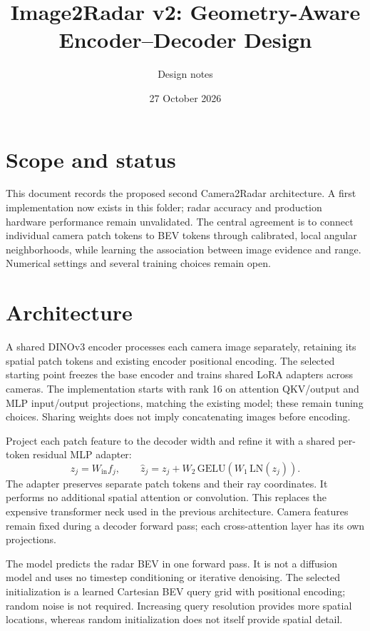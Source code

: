 \documentclass[11pt,a4paper]{article}
\title{Image2Radar v2: Geometry-Aware Encoder--Decoder Design}
\author{Design notes}
\date{27 October 2026}
\begin{document}
\maketitle

\section{Scope and status}
This document records the proposed second Camera2Radar architecture. A first implementation now exists in this folder; radar accuracy and production hardware performance remain unvalidated. The central agreement is to connect individual camera patch tokens to BEV tokens through calibrated, local angular neighborhoods, while learning the association between image evidence and range. Numerical settings and several training choices remain open.

\section{Architecture}
A shared DINOv3 encoder processes each camera image separately, retaining its spatial patch tokens and existing encoder positional encoding. The selected starting point freezes the base encoder and trains shared LoRA adapters across cameras. The implementation starts with rank 16 on attention QKV/output and MLP input/output projections, matching the existing model; these remain tuning choices. Sharing weights does not imply concatenating images before encoding.

Project each patch feature to the decoder width and refine it with a shared per-token residual MLP adapter:
\begin{equation}
 z_j=W_{\mathrm{in}}f_j,\qquad
 \widehat z_j=z_j+W_2\,\mathrm{GELU}\!\left(W_1\,\mathrm{LN}(z_j)\right).
\end{equation}
The adapter preserves separate patch tokens and their ray coordinates. It performs no additional spatial attention or convolution. This replaces the expensive transformer neck used in the previous architecture. Camera features remain fixed during a decoder forward pass; each cross-attention layer has its own projections.

The model predicts the radar BEV in one forward pass. It is not a diffusion model and uses no timestep conditioning or iterative denoising. The selected initialization is a learned Cartesian BEV query grid with positional encoding; random noise is not required. Increasing query resolution provides more spatial locations, whereas random initialization does not itself provide spatial detail.
\end{document}
